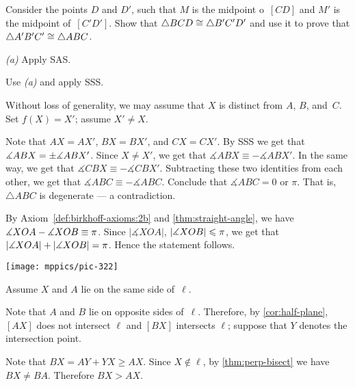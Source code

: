 \begin{multicols}{2}
Consider the points $D$ and $D'$, such that 
$M$ is the midpoint o~$[CD]$
and 
$M'$ is the midpoint of~$[C'D']$.
Show that $\triangle BCD\z\cong \triangle B'C'D'$ and use it to prove that $\triangle A' B' C'\z\cong\triangle A B C$.

 \textit{(a)} Apply SAS.

 Use \textit{(a)} and apply SSS.

Without loss of generality, we may assume that $X$ is distinct from $A$, $B$, and~$C$.
Set $f(X)=X'$; assume $X'\ne X$.

Note that $AX=AX'$, $BX=BX'$, and $CX=CX'$.
By SSS we get that $\measuredangle ABX\z=\pm\measuredangle ABX'$.
Since $X\ne X'$, we get that
$\measuredangle ABX\equiv - \measuredangle ABX'$.
In the same way, we get that 
$\measuredangle CBX\equiv - \measuredangle CBX'$.
Subtracting these two identities from each other, we get that
$\measuredangle ABC\equiv -\measuredangle ABC$.
Conclude that $\measuredangle ABC=0$ or $\pi$.
That is, $\triangle ABC$ is degenerate --- a contradiction. 



\setcounter{eqtn}{0}

{

By Axiom~\ref{def:birkhoff-axioms:2b} and \ref{thm:straight-angle}, we have
$\measuredangle XOA\z-\measuredangle XOB\z\equiv\pi$.
Since $|\measuredangle XOA|$, $|\measuredangle XOB|\z\le \pi$, we get that
$|\measuredangle XOA|\z+|\measuredangle XOB|\z=\pi$.
Hence the statement follows. 

\begin{Figure}
\vskip -0mm
\centering
\texttt{[image: mppics/pic-322]}
\end{Figure}


Assume $X$ and $A$ lie on the same side of~$\ell$.

Note that $A$ and $B$ lie on opposite sides of~$\ell$.
Therefore, by \ref{cor:half-plane}, 
$[AX]$ does not intersect $\ell$ 
and $[BX]$ intersects $\ell$;
suppose that $Y$ denotes the intersection point.

}

Note that $BX=AY+YX\ge AX$.
Since $X\notin\ell$, by \ref{thm:perp-bisect} we have $BX\ne BA$.
Therefore $BX> AX$.


\end{multicols}
